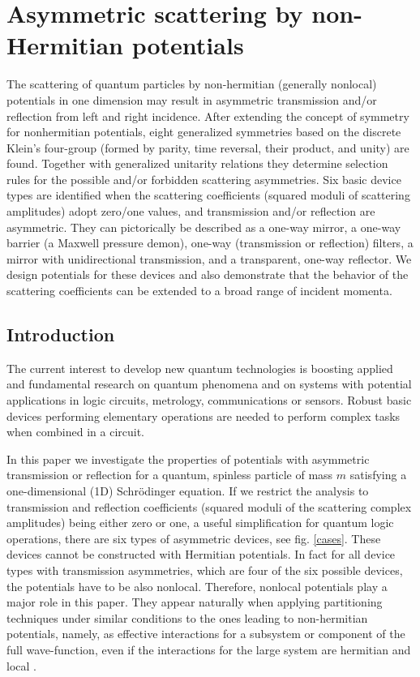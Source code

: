 
\chapter{Asymmetric scattering by non-Hermitian potentials}
\label{Chapter1}
%
The scattering of quantum particles by non-hermitian (generally nonlocal)  potentials in one dimension
may result in asymmetric transmission and/or reflection from left and right incidence.
After extending the concept of symmetry for nonhermitian potentials, eight generalized symmetries based on the discrete  Klein's four-group
(formed by parity, time reversal, their product, and unity) are found. Together with generalized unitarity relations they determine
selection rules for the possible and/or forbidden scattering asymmetries.
Six basic device types are
identified when the scattering coefficients (squared moduli of scattering amplitudes)
adopt zero/one values, and transmission and/or reflection are asymmetric.
They can pictorically be described as a
one-way mirror, a one-way barrier (a Maxwell  pressure demon), one-way (transmission or reflection) filters,
a mirror with unidirectional transmission, and a transparent, one-way reflector. We design potentials
for these devices and also demonstrate that the  behavior of the scattering
coefficients can be extended to a broad range of incident momenta.
%
\newpage
%
\section{Introduction}

The current interest to develop new quantum technologies is boosting applied and fundamental
research on quantum phenomena and on systems with potential applications in logic circuits, metrology, communications or sensors.
Robust basic devices performing elementary operations are needed to perform
complex tasks when combined in a circuit.

In this paper we investigate the properties of potentials with asymmetric
transmission or reflection for a quantum, spinless particle of mass $m$ satisfying a one-dimensional (1D) Schr\"odinger equation. If we restrict the analysis  to  transmission and reflection coefficients (squared moduli
of the scattering complex amplitudes) being  either zero or one, a useful simplification for quantum logic operations,
there are six types of asymmetric devices, see fig. \ref{cases}.
These devices cannot be constructed with Hermitian potentials. In fact for all device types with transmission asymmetries,
which are four of the six possible devices,
the potentials have to be also nonlocal. Therefore, nonlocal potentials play a major role in this paper. They appear naturally when applying partitioning techniques
under similar conditions to the
ones leading to non-hermitian  potentials, namely, as effective interactions for a subsystem or component of the full wave-function,
even if the interactions for the large system are hermitian and local \cite{Muga2004}.


